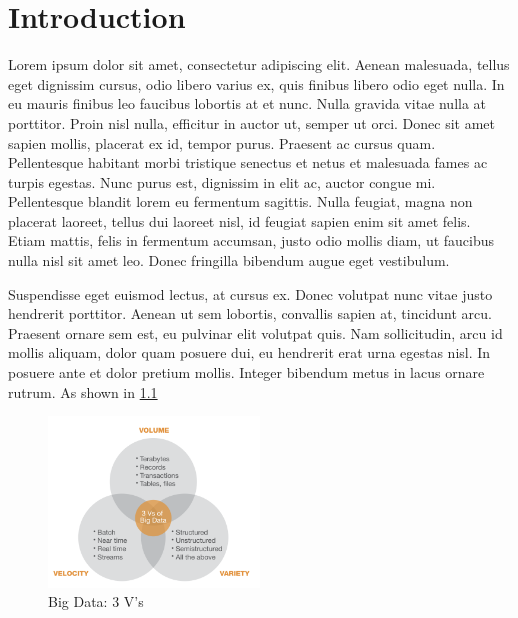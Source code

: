 \chapter{Introduction}
\setcounter{page}{1}


Lorem ipsum dolor sit amet, consectetur adipiscing elit. Aenean malesuada, tellus eget dignissim cursus, odio libero varius ex, quis finibus libero odio eget nulla. In eu mauris finibus leo faucibus lobortis at et nunc. Nulla gravida vitae nulla at porttitor. Proin nisl nulla, efficitur in auctor ut, semper ut orci. Donec sit amet sapien mollis, placerat ex id, tempor purus. Praesent ac cursus quam. Pellentesque habitant morbi tristique senectus et netus et malesuada fames ac turpis egestas. Nunc purus est, dignissim in elit ac, auctor congue mi. Pellentesque blandit lorem eu fermentum sagittis. Nulla feugiat, magna non placerat laoreet, tellus dui laoreet nisl, id feugiat sapien enim sit amet felis. Etiam mattis, felis in fermentum accumsan, justo odio mollis diam, ut faucibus nulla nisl sit amet leo. Donec fringilla bibendum augue eget vestibulum.

Suspendisse eget euismod lectus, at cursus ex. Donec volutpat nunc vitae justo hendrerit porttitor. Aenean ut sem lobortis, convallis sapien at, tincidunt arcu. Praesent ornare sem est, eu pulvinar elit volutpat quis. Nam sollicitudin, arcu id mollis aliquam, dolor quam posuere dui, eu hendrerit erat urna egestas nisl. In posuere ante et dolor pretium mollis. Integer bibendum metus in lacus ornare rutrum. As shown in \ref{bigData}



\begin{figure}[h]
    \centering
    \includegraphics[width=0.5\textwidth]{images/big_data.png}
    \caption{Big Data: 3 V's}
    \label{bigData}
\end{figure}




